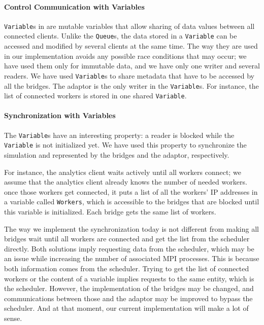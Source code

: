 \paragraph{Control Communication with \dask Variables}
\texttt{Variable}s in \dask are mutable variables that allow sharing of data values between all connected clients. Unlike the \texttt{Queue}s, the data stored in a \dask \texttt{Variable} can be accessed and modified by several clients at the same time. The way they are used in our implementation avoids any possible race conditions that may occur; we have used them only for immutable data, and we have only one writer and several readers.
We have used \texttt{Variable}s to share metadata that have to be accessed by all the bridges. The adaptor is the only writer in the \texttt{Variable}s. For instance, the list of connected workers is stored in one shared \texttt{Variable}.  

\paragraph{Synchronization with \dask Variables}
The \texttt{Variable}s have an interesting property: a reader is blocked while the \texttt{Variable} is not initialized yet. We have used this property to synchronize the simulation and \dask represented by the bridges and the adaptor, respectively.  

For instance, the analytics client waits actively until all workers connect; we assume that the analytics client already knows the number of needed workers. once those workers get connected, it puts a list of all the workers' IP addresses in a variable called \texttt{Workers}, which is accessible to the bridges that are blocked until this variable is initialized. Each bridge gets the same list of workers.

The way we implement the synchronization today is not different from making all bridges wait until all workers are connected and get the list from the scheduler directly. Both solutions imply requesting data from the scheduler, which may be an issue while increasing the number of associated MPI processes. This is because both information comes from the scheduler. Trying to get the list of connected workers or the content of a variable implies requests to the same entity, which is the scheduler. However, the implementation of the bridges may be changed, and communications between those and the adaptor may be improved to bypass the scheduler. And at that moment, our current implementation will make a lot of sense.    


